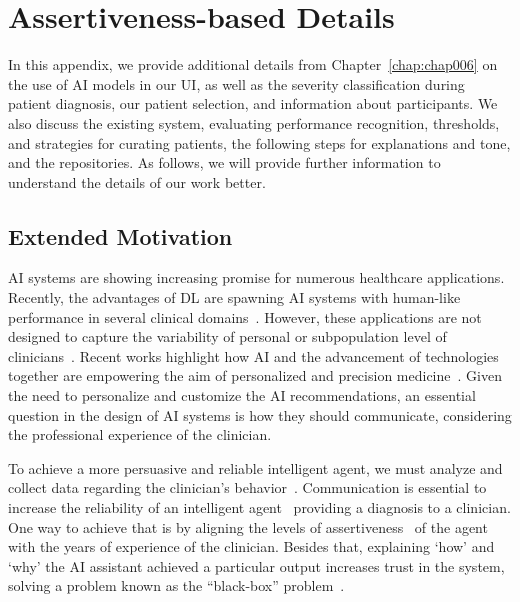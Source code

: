 \chapter{Assertiveness-based Details}
\label{chap:app005}

In this appendix, we provide additional details from Chapter~\ref{chap:chap006} on the use of \ac{AI} models in our \ac{UI}, as well as the severity classification during patient diagnosis, our patient selection, and information about participants.
We also discuss the existing system, evaluating performance recognition, thresholds, and strategies for curating patients, the following steps for explanations and tone, and the repositories.
As follows, we will provide further information to understand the details of our work better.

\section{Extended Motivation}
\label{sec:app005001}

\ac{AI} systems are showing increasing promise for numerous healthcare applications.
Recently, the advantages of \ac{DL} are spawning \ac{AI} systems with human-like performance in several clinical domains~\cite{CALISTO2022102285, Hannun2019, Ruamviboonsuk2019}.
However, these applications are not designed to capture the variability of personal or subpopulation level of clinicians~\cite{Uddin2019}.
Recent works highlight how \ac{AI} and the advancement of technologies together are empowering the aim of personalized and precision medicine~\cite{HO2020497, Wetzstein2020}.
Given the need to personalize and customize the \ac{AI} recommendations, an essential question in the design of \ac{AI} systems is how they should communicate, considering the professional experience of the clinician.

To achieve a more persuasive and reliable intelligent agent, we must analyze and collect data regarding the clinician's behavior~\cite{PELAU2021106855}.
Communication is essential to increase the reliability of an intelligent agent~\cite{10.1145/3311350.3347162} providing a diagnosis to a clinician.
One way to achieve that is by aligning the levels of assertiveness~\cite{pacheco2019alignment} of the agent with the years of experience of the clinician.
Besides that, explaining `how' and `why' the \ac{AI} assistant achieved a particular output increases trust in the system, solving a problem known as the ``black-box'' problem~\cite{10.1145/3491102.3502104, CALISTO2021102607}.

